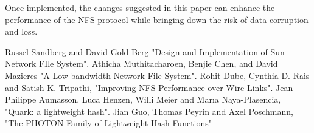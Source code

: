 \documentclass[conference]{IEEEtran}
\begin{document}
Once implemented, the changes suggested in this paper can enhance the
performance of the NFS protocol while bringing down the risk of data corruption
and loss.

\begin{thebibliography}{00}
 Russel Sandberg and David Gold Berg "Design and Implementation of Sun Network FIle System". 
 Athicha Muthitacharoen, Benjie Chen, and David Mazieres "A Low-bandwidth Network File System".
 Rohit Dube, Cynthia D. Rais and Satish K. Tripathi, "Improving NFS Performance over Wire Links".
 Jean-Philippe Aumasson, Luca Henzen, Willi Meier and  Marıa Naya-Plasencia, "Quark: a lightweight hash".
Jian Guo, Thomas Peyrin and Axel Poschmann, "The PHOTON Family of Lightweight Hash Functions"

\end{thebibliography}
\end{document}
